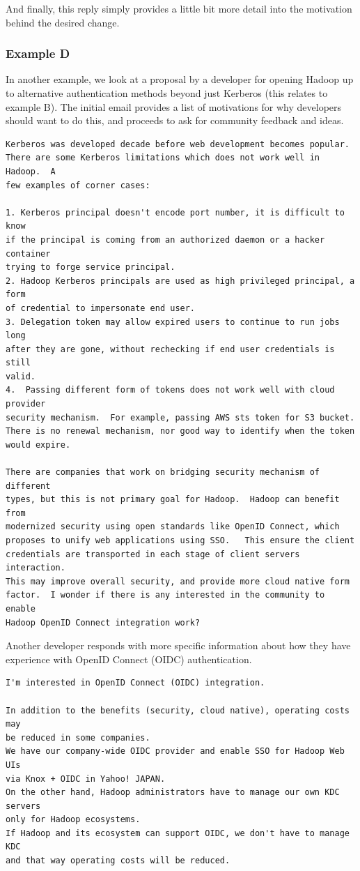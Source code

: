 \documentclass[a4paper, 12pt]{article}
\begin{document}
			And finally, this reply simply provides a little bit more detail into the motivation behind the desired change.
			
		\subsubsection{Example D}
			In another example, we look at a proposal by a developer for opening Hadoop up to alternative authentication methods beyond just Kerberos (this relates to example B). The initial email provides a list of motivations for why developers should want to do this, and proceeds to ask for community feedback and ideas.
			
			\begin{verbatim}
Kerberos was developed decade before web development becomes popular.
There are some Kerberos limitations which does not work well in Hadoop.  A
few examples of corner cases:

1. Kerberos principal doesn't encode port number, it is difficult to know
if the principal is coming from an authorized daemon or a hacker container
trying to forge service principal.
2. Hadoop Kerberos principals are used as high privileged principal, a form
of credential to impersonate end user.
3. Delegation token may allow expired users to continue to run jobs long
after they are gone, without rechecking if end user credentials is still
valid.
4.  Passing different form of tokens does not work well with cloud provider
security mechanism.  For example, passing AWS sts token for S3 bucket.
There is no renewal mechanism, nor good way to identify when the token
would expire.

There are companies that work on bridging security mechanism of different
types, but this is not primary goal for Hadoop.  Hadoop can benefit from
modernized security using open standards like OpenID Connect, which
proposes to unify web applications using SSO.   This ensure the client
credentials are transported in each stage of client servers interaction.
This may improve overall security, and provide more cloud native form
factor.  I wonder if there is any interested in the community to enable
Hadoop OpenID Connect integration work?
			\end{verbatim}
		
			Another developer responds with more specific information about how they have experience with OpenID Connect (OIDC) authentication.
			
			\begin{verbatim}
I'm interested in OpenID Connect (OIDC) integration.

In addition to the benefits (security, cloud native), operating costs may
be reduced in some companies.
We have our company-wide OIDC provider and enable SSO for Hadoop Web UIs
via Knox + OIDC in Yahoo! JAPAN.
On the other hand, Hadoop administrators have to manage our own KDC servers
only for Hadoop ecosystems.
If Hadoop and its ecosystem can support OIDC, we don't have to manage KDC
and that way operating costs will be reduced.
			\end{verbatim}
		
\end{document}
